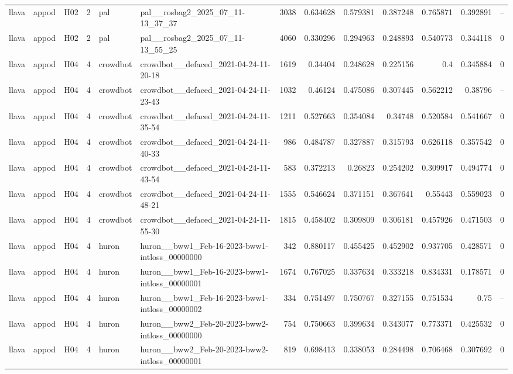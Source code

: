 \begin{longtable}{lllrllrrrrrrr}
llava & appod & H02 & 2 & pal & pal\_\_rosbag2\_2025\_07\_11-13\_37\_37 & 3038 & 0.634628 & 0.579381 & 0.387248 & 0.765871 & 0.392891 & -- \\
llava & appod & H02 & 2 & pal & pal\_\_rosbag2\_2025\_07\_11-13\_55\_25 & 4060 & 0.330296 & 0.294963 & 0.248893 & 0.540773 & 0.344118 & 0 \\
llava & appod & H04 & 4 & crowdbot & crowdbot\_\_defaced\_2021-04-24-11-20-18 & 1619 & 0.34404 & 0.248628 & 0.225156 & 0.4 & 0.345884 & 0 \\
llava & appod & H04 & 4 & crowdbot & crowdbot\_\_defaced\_2021-04-24-11-23-43 & 1032 & 0.46124 & 0.475086 & 0.307445 & 0.562212 & 0.38796 & -- \\
llava & appod & H04 & 4 & crowdbot & crowdbot\_\_defaced\_2021-04-24-11-35-54 & 1211 & 0.527663 & 0.354084 & 0.34748 & 0.520584 & 0.541667 & 0 \\
llava & appod & H04 & 4 & crowdbot & crowdbot\_\_defaced\_2021-04-24-11-40-33 & 986 & 0.484787 & 0.327887 & 0.315793 & 0.626118 & 0.357542 & 0 \\
llava & appod & H04 & 4 & crowdbot & crowdbot\_\_defaced\_2021-04-24-11-43-54 & 583 & 0.372213 & 0.26823 & 0.254202 & 0.309917 & 0.494774 & 0 \\
llava & appod & H04 & 4 & crowdbot & crowdbot\_\_defaced\_2021-04-24-11-48-21 & 1555 & 0.546624 & 0.371151 & 0.367641 & 0.55443 & 0.559023 & 0 \\
llava & appod & H04 & 4 & crowdbot & crowdbot\_\_defaced\_2021-04-24-11-55-30 & 1815 & 0.458402 & 0.309809 & 0.306181 & 0.457926 & 0.471503 & 0 \\
llava & appod & H04 & 4 & huron & huron\_\_bww1\_Feb-16-2023-bww1-intloss\_00000000 & 342 & 0.880117 & 0.455425 & 0.452902 & 0.937705 & 0.428571 & 0 \\
llava & appod & H04 & 4 & huron & huron\_\_bww1\_Feb-16-2023-bww1-intloss\_00000001 & 1674 & 0.767025 & 0.337634 & 0.333218 & 0.834331 & 0.178571 & 0 \\
llava & appod & H04 & 4 & huron & huron\_\_bww1\_Feb-16-2023-bww1-intloss\_00000002 & 334 & 0.751497 & 0.750767 & 0.327155 & 0.751534 & 0.75 & -- \\
llava & appod & H04 & 4 & huron & huron\_\_bww2\_Feb-20-2023-bww2-intloss\_00000000 & 754 & 0.750663 & 0.399634 & 0.343077 & 0.773371 & 0.425532 & 0 \\
llava & appod & H04 & 4 & huron & huron\_\_bww2\_Feb-20-2023-bww2-intloss\_00000001 & 819 & 0.698413 & 0.338053 & 0.284498 & 0.706468 & 0.307692 & 0 \\

\end{longtable}
